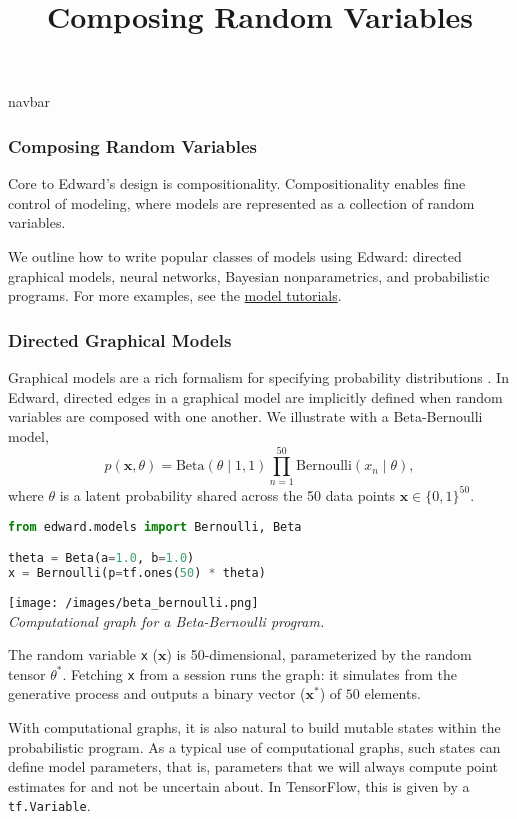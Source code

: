 \title{Composing Random Variables}

{{navbar}}

\subsubsection{Composing Random Variables}

Core to Edward's design is compositionality. Compositionality enables
fine control of modeling, where models are represented as a collection
of random variables.

We outline how to write popular classes of models using Edward:
directed graphical models, neural networks, Bayesian nonparametrics,
and probabilistic programs. For more examples, see the
\href{/tutorials/}{model tutorials}.

\subsubsection{Directed Graphical Models}

Graphical models are a rich formalism for specifying probability
distributions \citep{koller2009probabilistic}.
In Edward, directed edges in a graphical model are implicitly defined
when random variables are composed with one another. We illustrate
with a Beta-Bernoulli model,
\begin{equation*}
p(\mathbf{x}, \theta) =
\text{Beta}(\theta\mid 1, 1)
\prod_{n=1}^{50} \text{Bernoulli}(x_n\mid \theta),
\end{equation*}
where $\theta$ is a latent probability shared across the 50 data
points $\mathbf{x}\in\{0,1\}^{50}$.

\begin{lstlisting}[language=python]
from edward.models import Bernoulli, Beta

theta = Beta(a=1.0, b=1.0)
x = Bernoulli(p=tf.ones(50) * theta)
\end{lstlisting}

\texttt{[image: /images/beta\_bernoulli.png]} \\
{\small\textit{%
Computational graph for a Beta-Bernoulli program.
}}

The random variable \texttt{x} ($\mathbf{x}$) is 50-dimensional,
parameterized by the random tensor $\theta^*$. Fetching \texttt{x}
from a session runs the graph: it simulates from the generative process
and outputs a binary vector ($\mathbf{x}^*$) of $50$ elements.

With computational graphs, it is also natural to build mutable states
within the probabilistic program. As a typical use of computational
graphs, such states can define model parameters, that is, parameters
that we will always compute point estimates for and not be uncertain
about. In TensorFlow, this is given by a \texttt{tf.Variable}.

